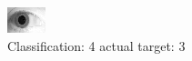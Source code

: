 \begin{figure}[h!]
\begin{center}
\includegraphics[width=0.60\columnwidth]{figures/ID1936_class_4_target_3.png}
\end{center}
\caption{ Classification: 4 actual target: 3}
\label{fig:ID1936_class_4_target_3}
\end{figure}
